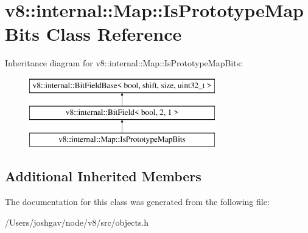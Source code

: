 \hypertarget{classv8_1_1internal_1_1_map_1_1_is_prototype_map_bits}{}\section{v8\+:\+:internal\+:\+:Map\+:\+:Is\+Prototype\+Map\+Bits Class Reference}
\label{classv8_1_1internal_1_1_map_1_1_is_prototype_map_bits}
Inheritance diagram for v8\+:\+:internal\+:\+:Map\+:\+:Is\+Prototype\+Map\+Bits\+:\begin{figure}[H]
\begin{center}
\leavevmode
\includegraphics[height=3.000000cm]{classv8_1_1internal_1_1_map_1_1_is_prototype_map_bits}
\end{center}
\end{figure}
\subsection*{Additional Inherited Members}


The documentation for this class was generated from the following file\+:\begin{DoxyCompactItemize}
\item 
/\+Users/joshgav/node/v8/src/objects.\+h\end{DoxyCompactItemize}
